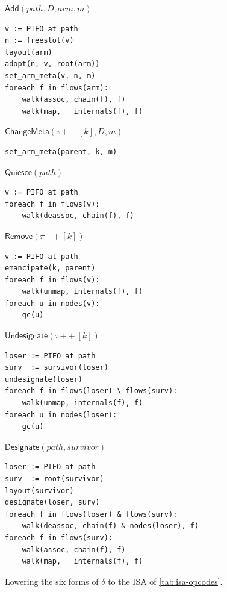 \documentclass[sigplan,anonymous,review,nonacm]{acmart}
\newcommand{\Add}{\textsf{Add}}
\newcommand{\ChangeMeta}{\textsf{ChangeMeta}}
\newcommand{\Quiesce}{\textsf{Quiesce}}
\newcommand{\Remove}{\textsf{Remove}}
\newcommand{\Designate}{\textsf{Designate}}
\newcommand{\Undesignate}{\textsf{Undesignate}}
\begin{document}
\begin{figure}[t]
\footnotesize


\noindent\begin{minipage}[t]{0.47\linewidth}
\(\Add(\mathit{path}, D, \mathit{arm}, m)\)
\begin{Verbatim}[fontsize=\footnotesize]
v := PIFO at path
n := freeslot(v)
layout(arm)
adopt(n, v, root(arm))
set_arm_meta(v, n, m)
foreach f in flows(arm):
    walk(assoc, chain(f), f)
    walk(map,   internals(f), f)
\end{Verbatim}
\end{minipage}\hfill
\begin{minipage}[t]{0.47\linewidth}
\(\ChangeMeta(\pi \mathbin{+\!\!+} [k], D, m)\)
\begin{Verbatim}[fontsize=\footnotesize]
set_arm_meta(parent, k, m)
\end{Verbatim}

\medskip
\(\Quiesce(\mathit{path})\)
\begin{Verbatim}[fontsize=\footnotesize]
v := PIFO at path
foreach f in flows(v):
    walk(deassoc, chain(f), f)
\end{Verbatim}
\end{minipage}

\medskip

\noindent\begin{minipage}[t]{0.47\linewidth}
\(\Remove(\pi \mathbin{+\!\!+} [k])\)
\begin{Verbatim}[fontsize=\footnotesize]
v := PIFO at path
emancipate(k, parent)
foreach f in flows(v):
    walk(unmap, internals(f), f)
foreach u in nodes(v):
    gc(u)
\end{Verbatim}
\end{minipage}\hfill
\begin{minipage}[t]{0.47\linewidth}
\(\Undesignate(\pi \mathbin{+\!\!+} [k])\)
\begin{Verbatim}[fontsize=\footnotesize]
loser := PIFO at path
surv  := survivor(loser)
undesignate(loser)
foreach f in flows(loser) \ flows(surv):
    walk(unmap, internals(f), f)
foreach u in nodes(loser):
    gc(u)
\end{Verbatim}
\end{minipage}

\medskip

\noindent\begin{minipage}[t]{0.47\linewidth}
\(\Designate(\mathit{path}, \mathit{survivor})\)
\begin{Verbatim}[fontsize=\footnotesize]
loser := PIFO at path
surv  := root(survivor)
layout(survivor)
designate(loser, surv)
foreach f in flows(loser) & flows(surv):
    walk(deassoc, chain(f) & nodes(loser), f)
foreach f in flows(surv):
    walk(assoc, chain(f), f)
    walk(map,   internals(f), f)
\end{Verbatim}
\end{minipage}\hfill\mbox{}

\caption{Lowering the six forms of \(\delta\) to the ISA of \cref{tab:isa-opcodes}.}
\label{fig:lowering}
\end{figure}
\end{document}
